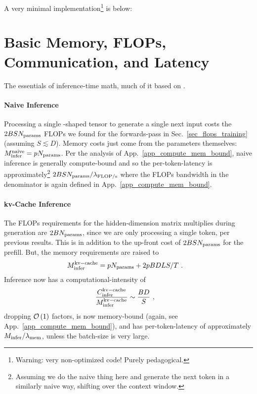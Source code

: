 A very minimal implementation\footnote{Warning: very non-optimized code! Purely pedagogical.} is below:


\section{Basic Memory, FLOPs, Communication, and Latency}

The essentials of inference-time math, much of it based on \cite{kipply_inference_math}.

\paragraph{Naive Inference} Processing a single -shaped tensor to generate a
single next input costs the $ 2BSN _{ {\rm params}  } $ FLOPs we found for the forwards-pass in
Sec.~\ref{sec_flops_training} (assuming $ S \lesssim D $). Memory costs just come from the parameters
themselves: $ M _{ {\rm infer}  }^{ {\rm naive}  }=pN _{ {\rm params}  } $. Per the analysis of
App.~\ref{app_compute_mem_bound}, naive inference is generally compute-bound and so the
per-token-latency is approximately\footnote{Assuming we do the naive thing here and generate the
    next token in a similarly naive way, shifting over the context window.}  $  2BSN _{ {\rm params}
    }/ \lambda _{ {\rm FLOP/s}  } $ where the FLOPs bandwidth in the denominator is again defined in
    App.~\ref{app_compute_mem_bound}.

\paragraph{kv-Cache Inference}
The FLOPs requirements for the hidden-dimension matrix multiplies during generation are $2BN _{ {\rm params}  } $,
since we are only processing a single token, per previous results.   This is in addition to the up-front cost of $ 2BSN _{
			{\rm params}} $ for the prefill. But, the memory requirements are raised to
\begin{align}
	M _{ {\rm infer}  }^{ {\rm kv-cache}  } & =pN _{ {\rm params}  } + 2pBDLS/T\ .
\end{align}
Inference now has a computational-intensity of
\begin{align}
	\frac{ C _{ {\rm infer} } ^{ {\rm kv-cache} } }{ M _{ {\rm infer}  }^{ {\rm kv-cache}  } } & \sim \frac{ BD }{ S } \ ,
\end{align}
dropping $ \mathcal{O} \left( 1 \right)  $ factors, is now memory-bound (again, see
App.~\ref{app_compute_mem_bound}), and has per-token-latency of approximately $ M _{ {\rm infer} }/
	\lambda _{ {\rm mem} }$, unless the batch-size is very large.


